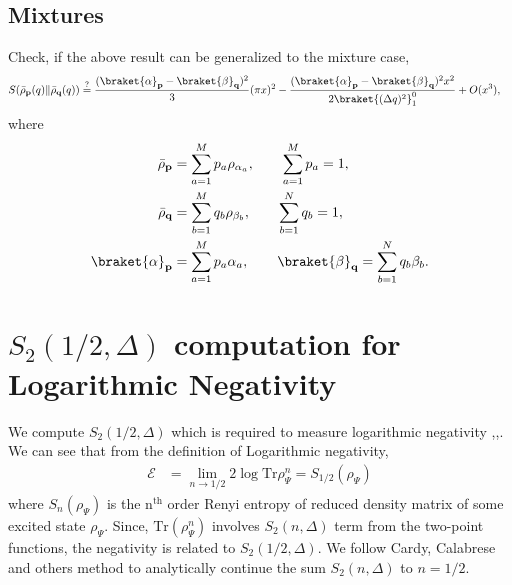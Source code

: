 \documentclass[11pt]{article}
\begin{document}
\subsection{Mixtures}
Check, if the above result can be generalized to the mixture case,
\begin{align}
    S(\bar\rho_\textbf{p}(q)\|\bar \rho_\textbf{q}(q)) &\overset{?}{=} \frac{( \braket{\alpha}_\textbf{p} - \braket{\beta}_\textbf{q}  )^2}{3}(\pi x)^2 - \frac{(\braket{\alpha}_\textbf{p} - \braket{\beta}_\textbf{q})^2x^2}{2\braket{(\Delta q)^2}_1^0}+ O(x^3),
\end{align}
where 
\begin{align}
    \bar{\rho}_\textbf{p} &= \sum_{a=1}^M p_a \rho_{\alpha_a}, \qquad \sum_{a=1}^M p_a = 1 ,\\
    \bar{\rho}_\textbf{q} &= \sum_{b=1}^M q_b \rho_{\beta_b}, \qquad \sum_{b=1}^N q_b = 1 ,\\
    \braket{\alpha}_\textbf{p} &= \sum_{a=1}^M p_a\alpha_a, \qquad \braket{\beta}_\textbf{q} = \sum_{b=1}^N q_b\beta_b.
\end{align}

\section{\texorpdfstring{$S_2(1/2,\Delta)$ computation for Logarithmic Negativity}{S2 (1/2) for logarithmic negativity}}
We compute $S_2(1/2,\Delta)$ which is required to measure logarithmic negativity \cite{Vidal_2002},\cite{Calabrese_2012},\cite{Calabrese_2013}. We can see that from the definition of Logarithmic negativity,
\begin{align}
    \mathcal{E} &= \lim_{n\to 1/2}2\log \text{Tr} \rho_\Psi^n = S_{1/2}(\rho_\Psi)
\end{align}
where $S_n(\rho_\Psi)$ is the $\text{n}^{\text{th}}$ order Renyi entropy of reduced density matrix of some excited state $\rho_\Psi$. 
Since, $\text{Tr}(\rho_\Psi^n)$ involves $S_2(n,\Delta)$ term from the two-point functions, the negativity is related to $S_2(1/2,\Delta)$. 
We follow Cardy, Calabrese and others
\cite{calabrese2011entanglement} method to analytically continue the sum $S_2(n,\Delta)$ to $n = 1/2$. 
\end{document}
